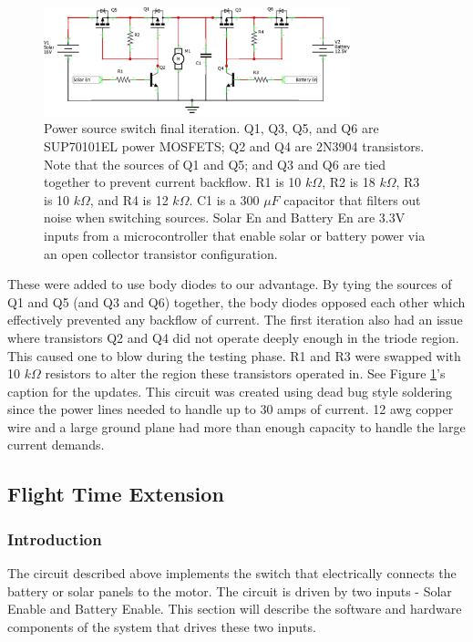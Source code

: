 \documentclass[12pt,journal,compsoc]{IEEEtran}
\begin{document}
\begin{figure}[h!]
\hspace*{0cm}
\centering
\includegraphics[width=3.5in]{solar_circuit3_schem.png}
\caption{Power source switch final iteration. Q1, Q3, Q5, and Q6 are SUP70101EL power MOSFETS; Q2 and Q4 are 2N3904 transistors. Note that the sources of Q1 and Q5; and Q3 and Q6 are tied together to prevent current backflow. R1 is 10 $k\Omega$, R2 is 18 $k\Omega$, R3 is 10 $k\Omega$, and R4 is 12 $k\Omega$. C1 is a 300 $\mu F$ capacitor that filters out noise when switching sources. Solar En and Battery En are 3.3V inputs from a microcontroller that enable solar or battery power via an open collector transistor configuration.}
\label{solSchem2}
\end{figure}
These were added to use body diodes to our advantage. By tying the sources of Q1 and Q5 (and Q3 and Q6) together, the body diodes opposed each other which effectively prevented any backflow of current. The first iteration also had an issue where transistors Q2 and Q4 did not operate deeply enough in the triode region. This caused one to blow during the testing phase. R1 and R3 were swapped with 10 $k\Omega$ resistors to alter the region these transistors operated in. See Figure \ref{solSchem2}'s caption for the updates. This circuit was created using dead bug style soldering since the power lines needed to handle up to 30 amps of current. 12 awg copper wire and a large ground plane had more than enough capacity to handle the large current demands.

\subsection{Flight Time Extension}
\subsubsection{Introduction}
The circuit described above implements the switch that electrically connects the battery or solar panels to the motor. The circuit is driven by two inputs - Solar Enable and Battery Enable. This section will describe the software and hardware components of the system that drives these two inputs. 
\end{document}
